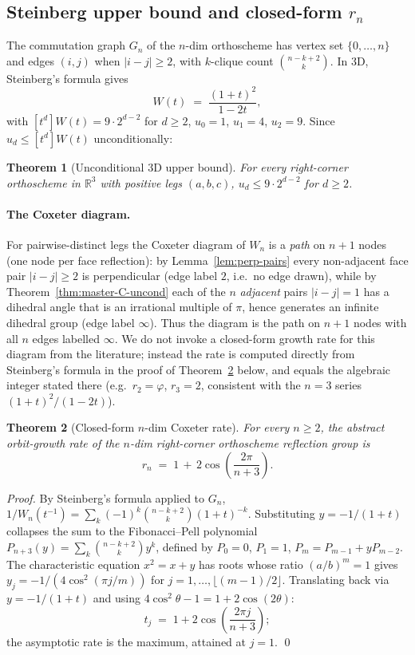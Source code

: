 \documentclass[11pt,a4paper]{article}
\newtheorem{theorem}{Theorem}
\theoremstyle{remark}
\theoremstyle{plain}
\begin{document}
\subsection{Steinberg upper bound and closed-form $r_n$}

The commutation graph $G_n$ of the $n$-dim orthoscheme has vertex set
$\{0, \ldots, n\}$ and edges $(i, j)$ when $|i - j| \ge 2$, with
$k$-clique count $\binom{n-k+2}{k}$.  In 3D, Steinberg's formula gives
\[
W(t) \;=\; \frac{(1+t)^2}{1 - 2t},
\]
with $[t^d] W(t) = 9 \cdot 2^{d-2}$ for $d \ge 2$, $u_0 = 1$, $u_1 = 4$,
$u_2 = 9$.  Since $u_d \le [t^d] W(t)$ unconditionally:

\begin{theorem}[Unconditional 3D upper bound]
\label{thm:upper-3d}
For every right-corner orthoscheme in $\mathbb{R}^3$ with positive legs
$(a, b, c)$, $u_d \le 9 \cdot 2^{d-2}$ for $d \ge 2$.
\end{theorem}

\paragraph{The Coxeter diagram.}
For pairwise-distinct legs the Coxeter diagram of $W_n$ is a \emph{path}
on $n+1$ nodes (one node per face reflection): by
Lemma~\ref{lem:perp-pairs} every non-adjacent face pair $|i-j| \ge 2$ is
perpendicular (edge label $2$, i.e.\ no edge drawn), while by
Theorem~\ref{thm:master-C-uncond} each of the $n$ \emph{adjacent} pairs
$|i-j| = 1$ has a dihedral angle that is an irrational multiple of $\pi$,
hence generates an infinite dihedral group (edge label $\infty$).  Thus
the diagram is the path on $n+1$ nodes with all $n$ edges labelled
$\infty$.  We do not invoke a closed-form growth rate for this diagram
from the literature; instead the rate is computed directly from
Steinberg's formula in the proof of Theorem~\ref{thm:ndim-rate} below,
and equals the algebraic integer stated there
(e.g.\ $r_2 = \varphi$, $r_3 = 2$, consistent with the $n = 3$ series
$(1+t)^2/(1-2t)$).

\begin{theorem}[Closed-form $n$-dim Coxeter rate]
\label{thm:ndim-rate}
For every $n \ge 2$, the abstract orbit-growth rate of the $n$-dim
right-corner orthoscheme reflection group is
\[
r_n  \;=\;  1 \,+\, 2 \cos\!\left(\frac{2\pi}{n+3}\right).
\]
\end{theorem}

\begin{proof}
By Steinberg's formula applied to $G_n$,
$1 / W_n(t^{-1}) = \sum_k (-1)^k \binom{n-k+2}{k} (1+t)^{-k}$.
Substituting $y = -1/(1+t)$ collapses the sum to the Fibonacci--Pell
polynomial $P_{n+3}(y) = \sum_k \binom{n-k+2}{k} y^k$, defined by
$P_0 = 0$, $P_1 = 1$, $P_m = P_{m-1} + y P_{m-2}$.  The characteristic
equation $x^2 = x + y$ has roots whose ratio $(a/b)^m = 1$ gives
$y_j = -1/(4 \cos^2(\pi j / m))$ for $j = 1, \ldots, \lfloor(m-1)/2\rfloor$.
Translating back via $y = -1/(1+t)$ and using
$4\cos^2\theta - 1 = 1 + 2\cos(2\theta)$:
\[
t_j  \;=\;  1 + 2 \cos\!\left(\frac{2\pi j}{n+3}\right);
\]
the asymptotic rate is the maximum, attained at $j = 1$.
\qed
\end{proof}
\end{document}
